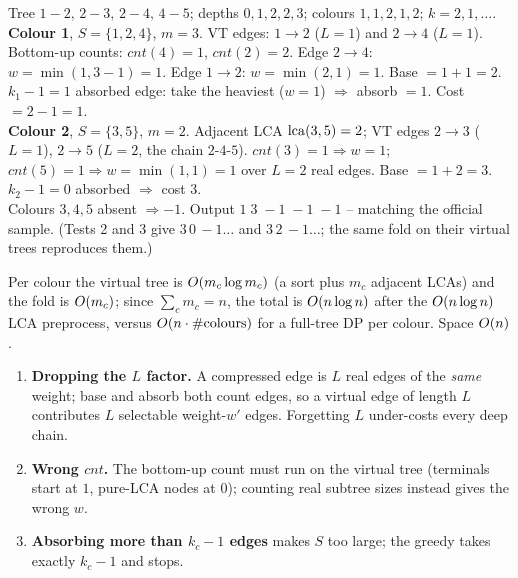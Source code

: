 \begin{tracebox}
Tree \(1\!-\!2,\,2\!-\!3,\,2\!-\!4,\,4\!-\!5\); depths \(0,1,2,2,3\); colours
\(1,1,2,1,2\); \(k=2,1,\dots\).\\
\textbf{Colour 1}, \(S=\{1,2,4\}\), \(m=3\). VT edges: \(1\!\to\!2\) (\(L=1\)) and
\(2\!\to\!4\) (\(L=1\)). Bottom-up counts: \(\mathit{cnt}(4)=1\), \(\mathit{cnt}(2)=2\).
Edge \(2\!\to\!4\): \(w=\min(1,3-1)=1\).  Edge \(1\!\to\!2\): \(w=\min(2,1)=1\).  Base
\(=1+1=2\).  \(k_1-1=1\) absorbed edge: take the heaviest (\(w=1\)) \(\Rightarrow\)
absorb \(=1\).  Cost \(=2-1=\boxed{1}\).\\
\textbf{Colour 2}, \(S=\{3,5\}\), \(m=2\). Adjacent LCA \(\operatorname{lca}(3,5)=2\); VT edges
\(2\!\to\!3\) (\(L=1\)), \(2\!\to\!5\) (\(L=2\), the chain \(2\text{-}4\text{-}5\)).
\(\mathit{cnt}(3)=1\Rightarrow w=1\); \(\mathit{cnt}(5)=1\Rightarrow w=\min(1,1)=1\) over
\(L=2\) real edges.  Base \(=1+2=3\).  \(k_2-1=0\) absorbed \(\Rightarrow\) cost
\(\boxed{3}\).\\
Colours \(3,4,5\) absent \(\Rightarrow -1\).  Output \(1\;3\;-1\;-1\;-1\) -- matching the
official sample.  (Tests 2 and 3 give \(3\,0\,-1\ldots\) and \(3\,2\,-1\ldots\);
the same fold on their virtual trees reproduces them.)
\end{tracebox}

\begin{complexitybox}[CF 2252F]
Per colour the virtual tree is \(O(m_c\log m_c)\) (a sort plus \(m_c\) adjacent LCAs)
and the fold is \(O(m_c)\); since \(\sum_c m_c=n\), the total is \(O(n\log n)\)
after the \(O(n\log n)\) LCA preprocess, versus \(O(n\cdot\#\text{colours})\) for a
full-tree DP per colour.  Space \(O(n)\).
\end{complexitybox}

\begin{warningbox}
\begin{enumerate}[nosep,leftmargin=1.6em]
  \item \textbf{Dropping the \(L\) factor.} A compressed edge is \(L\) real edges of the
        \emph{same} weight; base and absorb both count edges, so a virtual edge of
        length \(L\) contributes \(L\) selectable weight-\(w'\) edges.  Forgetting \(L\)
        under-costs every deep chain.
  \item \textbf{Wrong \(\mathit{cnt}\).} The bottom-up count must run on the virtual tree
        (terminals start at \(1\), pure-LCA nodes at \(0\)); counting real subtree sizes
        instead gives the wrong \(w\).
  \item \textbf{Absorbing more than \(k_c-1\) edges} makes \(S\) too large; the greedy
        takes exactly \(k_c-1\) and stops.
\end{enumerate}
\end{warningbox}

